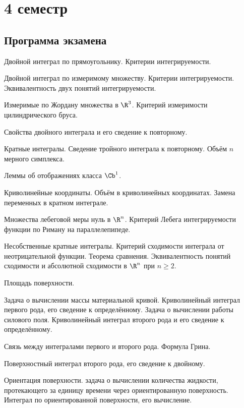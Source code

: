 \documentclass[a4paper]{article}
\begin{document}
\pagebreak

\section{4 семестр}

\subsection{Программа экзамена}

\begin{nums}{-2}
\item Двойной интеграл по прямоугольнику. Критерии интегрируемости.
\item Двойной интеграл по измеримому множеству. Критерии интегрируемости. Эквивалентность двух понятий интегрируемости.
\item Измеримые по Жордану множества в $\R^3$. Критерий измеримости цилиндрического бруса.
\item Свойства двойного интеграла и его сведение к повторному.
\item Кратные интегралы. Сведение тройного интеграла к повторному. Объём $n$ мерного симплекса.
\item Леммы об отображениях класса $\Cb^1$.
\item Криволинейные координаты. Объём в криволинейных координатах. Замена переменных в кратном интеграле.
\item Множества лебеговой меры нуль в $\R^n$. Критерий Лебега интегрируемости функции по Риману на параллелепипеде.
\item Несобственные кратные интегралы. Критерий сходимости интеграла от неотрицательной функции. Теорема сравнения.
Эквивалентность понятий сходимости и абсолютной сходимости в $\R^n$ при $n \ge 2$.
\item Площадь поверхности.
\item Задача о вычислении массы материальной кривой. Криволинейный интеграл первого рода, его сведение к определённому.
Задача о вычислении работы силового поля. Криволинейный интеграл второго рода и его сведение к определённому.
\item Связь между интегралами первого и второго рода. Формула Грина.
\item Поверхностный интеграл второго рода, его сведение к двойному.
\item Ориентация поверхности. задача о вычислении количества жидкости, протекающего за единицу времени через
ориентированную поверхность. Интеграл по ориентированной поверхности, его вычисление.

\end{nums}
\end{document}
